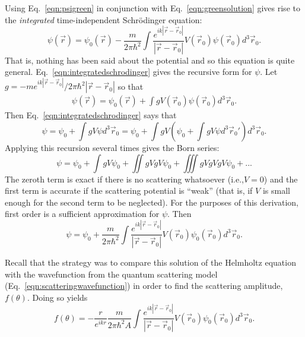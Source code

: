 Using Eq.~\eqref{eqn:psigreen} in conjunction with Eq.~\eqref{eqn:greensolution} gives rise to the \emph{integrated} time-independent Schr\"{o}dinger equation:
%
\begin{equation} \label{eqn:integratedschrodinger}
\psi(\vec{r})=\psi_0 (\vec{r})-\frac{m}{2\pi\hbar^2}\int\frac{e^{ik|\vec{r}-\vec{r}_0|}}{|\vec{r}-\vec{r}_0|}V(\vec{r}_0)\psi(\vec{r}_0)d^3\vec{r}_0.
\end{equation}
%
That is, nothing has been said about the potential and so this equation is quite general. Eq.~\eqref{eqn:integratedschrodinger} gives the recursive form for $\psi$. Let $g=-me^{ik|\vec{r}-\vec{r}_0|}/2\pi\hbar^2|\vec{r}-\vec{r}_0|$ so that
\begin{align*}
\psi(\vec{r})=\psi_0 (\vec{r})+\int gV(\vec{r}_0)\psi(\vec{r}_0)d^3\vec{r}_0.
\end{align*}
Then Eq.~\eqref{eqn:integratedschrodinger} says that
%
\begin{equation} \nonumber
\psi=\psi_0+\int gV\psi d^3\vec{r}_0= \psi_0+\int gV \left(\psi_0+\int gV \psi d^3\vec{r}_0\!'\right)d^3\vec{r}_0.
\end{equation}
%
Applying this recursion several times gives the Born series:
%
\begin{equation}\nonumber
\psi=\psi_0+\int gV\psi_0+\iint gVgV\psi_0 + \iiint gVgVgV\psi_0 + ...
\end{equation}
%
The zeroth term is exact if there is no scattering whatsoever (i.e.,$V=0$) and the first term is accurate if the scattering potential is ``weak'' (that is, if $V$ is small enough for the second term to be neglected). For the purposes of this derivation, first order is a sufficient approximation for $\psi$. Then
%
\begin{equation} \nonumber
\psi=\psi_0+\frac{m}{2\pi\hbar^2}\int\frac{e^{ik|\vec{r}-\vec{r}_0|}}{|\vec{r}-\vec{r}_0|}V(\vec{r}_0)\psi_0(\vec{r}_0) d^3\vec{r}_0.
\end{equation}

Recall that the strategy was to compare this solution of the Helmholtz equation with the wavefunction from the quantum scattering model (Eq.~\eqref{eqn:scatteringwavefunction}) in order to find the scattering amplitude, $f(\theta)$. Doing so yields
%
\begin{equation} \nonumber
f(\theta)=-\frac{r}{e^{ikr}}\frac{m}{2\pi\hbar^2A}\int\frac{e^{ik|\vec{r}-\vec{r}_0|}}{|\vec{r}-\vec{r}_0|}V(\vec{r}_0)\psi_0(\vec{r}_0)d^3\vec{r}_0.
\end{equation}
%


